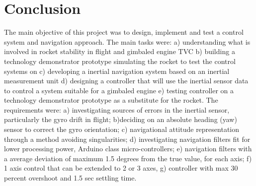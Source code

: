 \chapter{Conclusion}

The main objective of this project was to design, implement and test a control system and navigation approach. The main tasks were:
a) understanding what is involved in rocket stability in flight and gimbaled engine TVC
b) building a technology demonstrator prototype simulating the rocket to test the control systems on
c) developing a inertial navigation system based on an inertial measurement unit
d) designing a controller that will use the inertial sensor data to control a system suitable for a gimbaled engine
e) testing controller on a technology demonstrator prototype as a substitute for the rocket.
The requirements were: a) investigating sources of errors in the inertial sensor, particularly the gyro drift in flight; b)deciding on an absolute heading (yaw) sensor to correct the gyro orientation; c) navigational attitude representation through a method avoiding singularities; d) investigating navigation filters fit for lower processing power, Arduino class micro-controllers; e) navigation filters with a average deviation of maximum 1.5 degrees from the true value, for each axis; f) 1 axis control that can be extended to 2 or 3 axes, g) controller with max 30 percent overshoot and 1.5 sec settling time.


